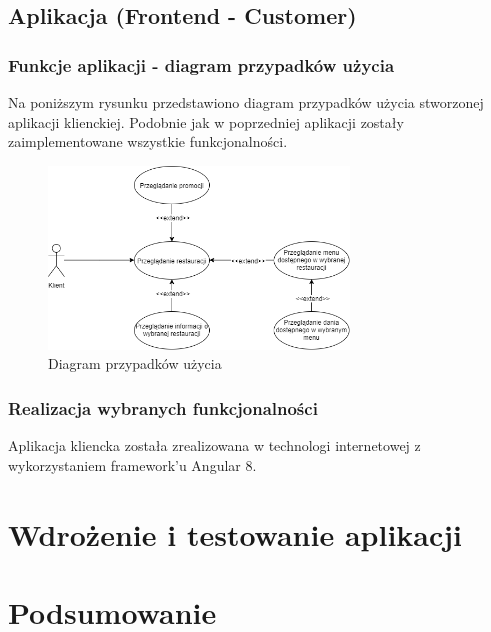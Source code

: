 \documentclass{article}
\begin{document}
	\subsection{Aplikacja (Frontend - Customer)}
		\subsubsection{Funkcje aplikacji - diagram przypadków użycia}
		Na poniższym rysunku przedstawiono diagram przypadków użycia stworzonej aplikacji klienckiej. Podobnie jak w poprzedniej aplikacji zostały zaimplementowane wszystkie funkcjonalności.
			\begin{figure}[hbt!]
				\includegraphics[width=8cm]{Files/Pictures/UMLCustomerApp}
				\centering
				\caption{Diagram przypadków użycia}
			\end{figure}
		\subsubsection{Realizacja wybranych funkcjonalności}	
		Aplikacja kliencka została zrealizowana w technologi internetowej z wykorzystaniem framework'u Angular 8.
\section{Wdrożenie i testowanie aplikacji}

\section{Podsumowanie}
 
\end{document}
